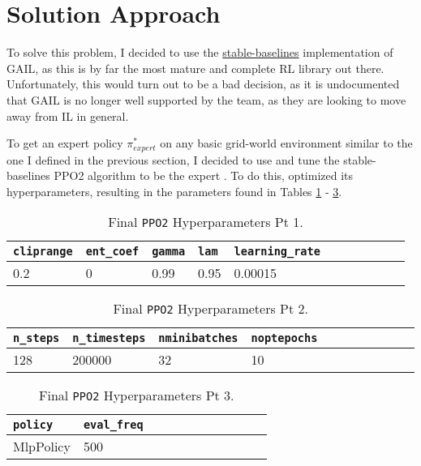 \section{Solution Approach}

To solve this problem, I decided to use the \href{https://stable-baselines.readthedocs.io/en/master/}{stable-baselines} implementation of GAIL, as this is by far the most mature and complete RL library out there. Unfortunately, this would turn out to be a bad decision, as it is undocumented that GAIL is no longer well supported by the team, as they are looking to move away from IL in general.

To get an expert policy $\pi^*_{expert}$ on any basic grid-world environment similar to the one I defined in the previous section, I decided to use and tune the stable-baselines PPO2 algorithm to be the expert \cite{PPO2}. To do this, optimized its hyperparameters, resulting in the parameters found in Tables 
\ref{t: ppo2_hyperparameters_1} - \ref{t: ppo2_hyperparameters_3}. 

\begin{table}
    \caption{Final \texttt{PPO2} Hyperparameters Pt 1.}
    \centering
    \begin{tabular}{|l|l|l|l|l|l|l|l|l|l|l|}
    \hline
        \texttt{cliprange} & \texttt{ent\_coef} & \texttt{gamma} & \texttt{lam} & \texttt{learning\_rate}\\ \hline
        0.2 & 0 & 0.99 & 0.95 & 0.00015 \\ \hline
    \end{tabular}
    \label{t: ppo2_hyperparameters_1}
\end{table}

\begin{table}
    \caption{Final \texttt{PPO2} Hyperparameters Pt 2.}
    \centering
    \begin{tabular}{|l|l|l|l|l|l|l|l|l|l|l|}
    \hline
        \texttt{n\_steps} & \texttt{n\_timesteps} & \texttt{nminibatches} & \texttt{noptepochs}\\ \hline
        128 & 200000 & 32 & 10\\ \hline
    \end{tabular}
    \label{t: ppo2_hyperparameters_2}
\end{table}

\begin{table}
    \caption{Final \texttt{PPO2} Hyperparameters Pt 3.}
    \centering
    \begin{tabular}{|l|l|l|l|l|l|l|l|l|l|l|}
    \hline
        \texttt{policy} & \texttt{eval\_freq}\\ \hline
        MlpPolicy & 500 \\ \hline
    \end{tabular}
    \label{t: ppo2_hyperparameters_3}
\end{table}

